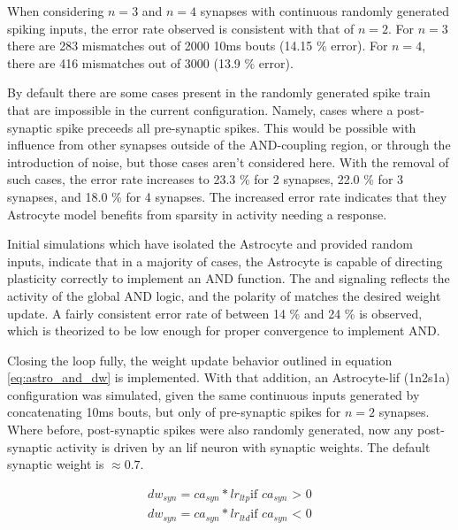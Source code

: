 
When considering $n=3$ and $n=4$ synapses with continuous randomly generated
spiking inputs, the error rate observed is consistent with that of $n=2$. For
$n=3$ there are 283 mismatches out of 2000 10ms bouts (14.15 \% error). For
$n=4$, there are 416 mismatches out of 3000 (13.9 \% error).

By default there are some cases present in the randomly generated spike train
that are impossible in the current configuration. Namely, cases where a
post-synaptic spike preceeds all pre-synaptic spikes. This would be possible
with influence from other synapses outside of the AND-coupling region, or
through the introduction of noise, but those cases aren't considered here. With
the removal of such cases, the error rate increases to 23.3 \% for 2 synapses,
22.0 \% for 3 synapses, and 18.0 \% for 4 synapses. The increased error rate
indicates that they Astrocyte model benefits from sparsity in activity needing a
response.

Initial simulations which have isolated the Astrocyte and provided random
inputs, indicate that in a majority of cases, the Astrocyte is capable of
directing plasticity correctly to implement an AND function. The
\dser and \serca signaling reflects the activity of the global AND logic, and
the polarity of \dser matches the desired weight update. A fairly consistent
error rate of between 14 \% and 24 \% is observed, which is theorized to be low
enough for proper convergence to implement AND.

Closing the loop fully, the weight update behavior outlined in equation
\ref{eq:astro_and_dw} is implemented. With that addition, an Astrocyte-\Gls{lif} (1n2s1a)
configuration was simulated, given the same continuous inputs generated by
concatenating 10ms bouts, but only of pre-synaptic spikes for $n=2$
synapses. Where before, post-synaptic spikes were also randomly generated, now
any post-synaptic activity is driven by an \Gls{lif} neuron with synaptic weights.
The default synaptic weight is $\approx 0.7$.

\begin{align}
  dw_{syn} = ca_{syn} * lr_{ltp} \text{if $ca_{syn}$ > 0} \\
  dw_{syn} = ca_{syn} * lr_{ltd} \text{if $ca_{syn}$ < 0} \\
\end{align}

